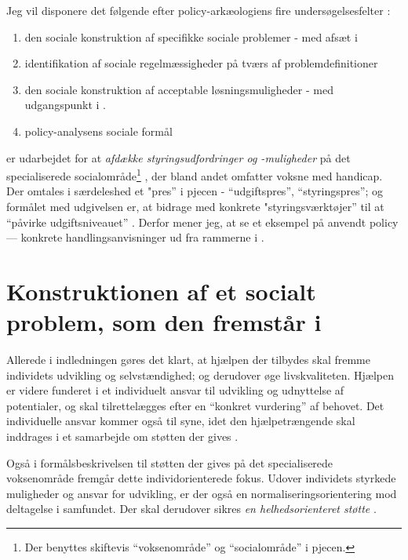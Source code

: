 Jeg vil disponere det følgende efter policy-arkæologiens fire undersøgelsesfelter \autocite[s. 300]{scheurichPolicyArchaeologyNew1994}:
\begin{enumerate}
  \item
    den sociale konstruktion af specifikke sociale problemer - med afsæt i 
  \item
    identifikation af sociale regelmæssigheder på tværs af problemdefinitioner
  \item
    den sociale konstruktion af acceptable løsningsmuligheder - med udgangspunkt i .
  \item
    policy-analysens sociale formål
\end{enumerate}

 er udarbejdet for at \textit{afdække styringsudfordringer og -muligheder} på det specialiserede socialområde\footnote{Der benyttes skiftevis “voksenområde” og “socialområde” i pjecen.} \autocite[s. 2]{klStyringAfDet2017}, der bland andet omfatter voksne med handicap.
Der omtales i særdeleshed et "pres” i pjecen - “udgiftspres”, “styringspres”; og formålet med udgivelsen er, at bidrage med konkrete "styringsværktøjer” til at “påvirke udgiftsniveauet” \autocite[s. 2, 3. m.fl.]{klStyringAfDet2017}.
Derfor mener jeg, at se et eksempel på anvendt policy — konkrete handlingsanvisninger ud fra rammerne i .

\section{Konstruktionen af et socialt problem, som den fremstår i }

Allerede i indledningen gøres det klart, at hjælpen der tilbydes skal fremme individets udvikling og selvstændighed; og derudover øge livskvaliteten.
Hjælpen er videre funderet i et individuelt ansvar til udvikling og udnyttelse af potentialer, og skal tilrettelægges efter en “konkret vurdering” af behovet.
Det individuelle ansvar kommer også til syne, idet den hjælpetrængende skal inddrages i et samarbejde om støtten der gives \autocite[§§ 2-3]{social-ogindenrigsministerietBekendtgorelseAfLov2019}.

Også i formålsbeskrivelsen til støtten der gives på det specialiserede voksenområde fremgår  dette individorienterede fokus.
Udover individets styrkede muligheder og ansvar for udvikling, er der også en normaliseringsorientering mod deltagelse i samfundet.
Der skal derudover sikres \textit{en helhedsorienteret støtte} \autocite[§ 81]{social-ogindenrigsministerietBekendtgorelseAfLov2019}.

